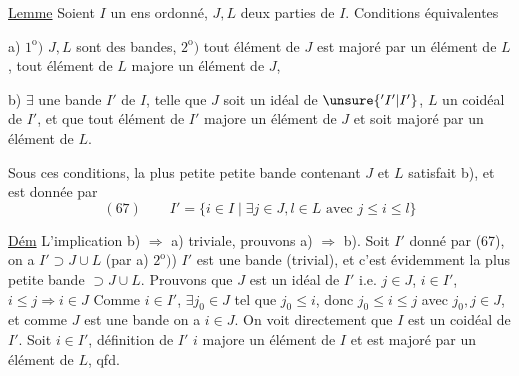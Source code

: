 
\uline{Lemme} Soient $I$ un ens ordonné, $J,L$ deux parties de $I$. Conditions équivalentes

a) $1^{\mathrm o})$ $J,L$ sont des bandes, $2^{\mathrm o})$ tout élément de $J$ est majoré par un élément de $L$, tout élément de $L$ majore un élément de $J$, 

b) $\exists$ une bande $I'$ de $I$, telle que $J$ soit un idéal de $\unsure{{}'I'|I'}$, $L$ un coidéal de $I'$, et que tout élément de $I'$ majore un élément de $J$ et soit majoré par un élément de $L$.

Sous ces conditions,    la plus petite petite bande  contenant $J$ et $L$ satisfait b), et est donnée par
\[
(67)\qquad I'=\{i\in I\mid\exists j\in J,l\in L\text{ avec }j\leq i\leq l\}
\]

\uline{Dém} L'implication b) $\Rightarrow$ a) triviale,  prouvons a) $\Rightarrow$ b). Soit $I'$ donné par (67), on a $I'\supset J\cup L$ (par a) $2^{\mathrm o})$) $I'$ est une bande (trivial), et c'est évidemment la plus petite bande $\supset J\cup L$. Prouvons que $J$ est un idéal de $I'$ i.e. $j\in J$, $i\in I'$, $i\leq j\Rightarrow i\in J$ Comme $i\in I'$, $\exists j_0\in J$ tel que $j_0\leq i$, donc $j_0\leq i\leq j$ avec $j_0,j\in J$, et comme $J$ est une bande  on a $i\in J$. On voit directement que $I$ est un coidéal de $I'$. Soit $i\in I'$,   définition de $I'$ $i$ majore un élément de $I$ et est majoré par un élément de $L$, qfd.
